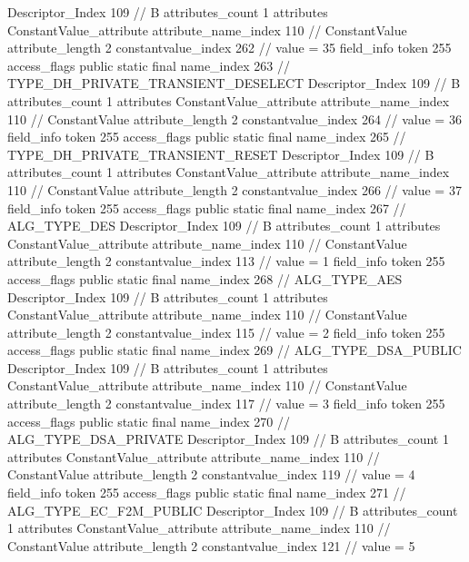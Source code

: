 {{{{{				Descriptor_Index	109		// B
				attributes_count	1
				attributes {
				ConstantValue_attribute {
					attribute_name_index	110		// ConstantValue
					attribute_length	2
					constantvalue_index	262		// value = 35
				}
				}
			}
			field_info {
				token	255
				access_flags	public static final
				name_index	263		// TYPE_DH_PRIVATE_TRANSIENT_DESELECT
				Descriptor_Index	109		// B
				attributes_count	1
				attributes {
				ConstantValue_attribute {
					attribute_name_index	110		// ConstantValue
					attribute_length	2
					constantvalue_index	264		// value = 36
				}
				}
			}
			field_info {
				token	255
				access_flags	public static final
				name_index	265		// TYPE_DH_PRIVATE_TRANSIENT_RESET
				Descriptor_Index	109		// B
				attributes_count	1
				attributes {
				ConstantValue_attribute {
					attribute_name_index	110		// ConstantValue
					attribute_length	2
					constantvalue_index	266		// value = 37
				}
				}
			}
			field_info {
				token	255
				access_flags	public static final
				name_index	267		// ALG_TYPE_DES
				Descriptor_Index	109		// B
				attributes_count	1
				attributes {
				ConstantValue_attribute {
					attribute_name_index	110		// ConstantValue
					attribute_length	2
					constantvalue_index	113		// value = 1
				}
				}
			}
			field_info {
				token	255
				access_flags	public static final
				name_index	268		// ALG_TYPE_AES
				Descriptor_Index	109		// B
				attributes_count	1
				attributes {
				ConstantValue_attribute {
					attribute_name_index	110		// ConstantValue
					attribute_length	2
					constantvalue_index	115		// value = 2
				}
				}
			}
			field_info {
				token	255
				access_flags	public static final
				name_index	269		// ALG_TYPE_DSA_PUBLIC
				Descriptor_Index	109		// B
				attributes_count	1
				attributes {
				ConstantValue_attribute {
					attribute_name_index	110		// ConstantValue
					attribute_length	2
					constantvalue_index	117		// value = 3
				}
				}
			}
			field_info {
				token	255
				access_flags	public static final
				name_index	270		// ALG_TYPE_DSA_PRIVATE
				Descriptor_Index	109		// B
				attributes_count	1
				attributes {
				ConstantValue_attribute {
					attribute_name_index	110		// ConstantValue
					attribute_length	2
					constantvalue_index	119		// value = 4
				}
				}
			}
			field_info {
				token	255
				access_flags	public static final
				name_index	271		// ALG_TYPE_EC_F2M_PUBLIC
				Descriptor_Index	109		// B
				attributes_count	1
				attributes {
				ConstantValue_attribute {
					attribute_name_index	110		// ConstantValue
					attribute_length	2
					constantvalue_index	121		// value = 5
}}}}}}}
